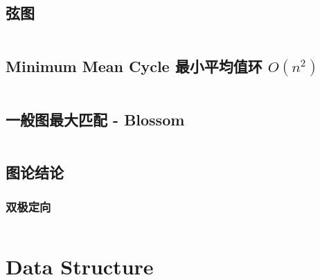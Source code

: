\documentclass[titlepage, a4paper, 11pt]{article}
\begin{document}
\begin{spacing}{1.15}
				\subsection{弦图}
					
					\inputminted{cpp}{src/TreeandGraph/弦图.cpp}
				\subsection{Minimum Mean Cycle 最小平均值环 $O(n^2)$}
					\inputminted{cpp}{src/TreeandGraph/MeanCycle.cpp}
				\subsection{一般图最大匹配 - Blossom}
					\inputminted{cpp}{src/TreeandGraph/Blossom.cpp}
				\subsection{图论结论}
					
					
					
					
					
					
					\subsubsection{双极定向}
					\inputminted{cpp}{src/tbr/bipolar_orientation.cpp}
					
					\newpage
			\section{Data Structure}

\end{spacing}
\end{document}
